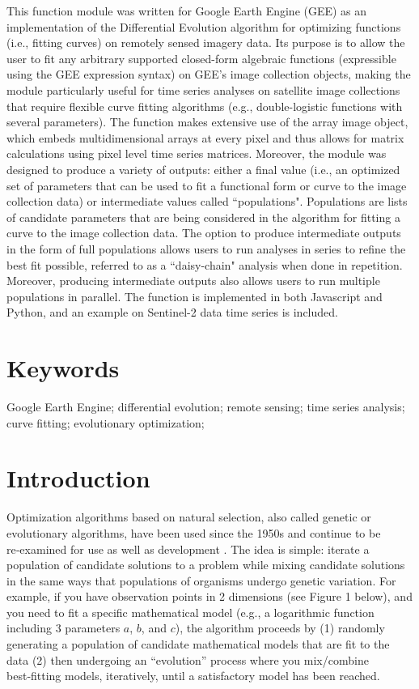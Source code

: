 \documentclass{jors}
\begin{document}
This function module was written for Google Earth Engine (GEE) as an implementation of the Differential Evolution algorithm for optimizing functions (i.e., fitting curves) on remotely sensed imagery data. Its purpose is to allow the user to fit any arbitrary supported closed-form algebraic functions (expressible using the GEE expression syntax) on GEE's image collection objects, making the module particularly useful for time series analyses on satellite image collections that require flexible curve fitting algorithms (e.g., double-logistic functions with several parameters). The function makes extensive use of the array image object, which embeds multidimensional arrays at every pixel and thus allows for matrix calculations using pixel level time series matrices. Moreover, the module was designed to produce a variety of outputs: either a final value (i.e., an optimized set of parameters that can be used to fit a functional form or curve to the image collection data) or intermediate values called ``populations". Populations are lists of candidate parameters that are being considered in the algorithm for fitting a curve to the image collection data. The option to produce intermediate outputs in the form of full populations allows users to run analyses in series to refine the best fit possible, referred to as a ``daisy-chain" analysis when done in repetition. Moreover, producing intermediate outputs also allows users to run multiple populations in parallel. The function is implemented in both Javascript and Python, and an example on Sentinel-2 data time series is included.

\section*{Keywords}

Google Earth Engine; differential evolution; remote sensing; time series analysis; curve fitting; evolutionary optimization;

\section*{Introduction}

Optimization algorithms based on natural selection, also called genetic
or evolutionary algorithms, have been used since the 1950s \cite{mitchell1998introduction} and continue to be re‑examined for use as well as development \cite{ahmad2022differential,das2016recent,das2010differential,pant2020differential,price2006differential}. The idea is simple: iterate a population of candidate solutions to a problem while mixing candidate solutions in the same ways that populations of organisms undergo genetic variation. For example, if you have observation points in 2 dimensions (see Figure 1 below), and you need to fit a specific mathematical model (e.g., a logarithmic function including 3 parameters $a$, $b$, and $c$), the algorithm proceeds by (1) randomly generating a population of candidate mathematical models that are fit to the data (2) then undergoing an ``evolution'' process where you mix/combine best‑fitting models, iteratively, until a satisfactory model has been reached.\par
\end{document}
